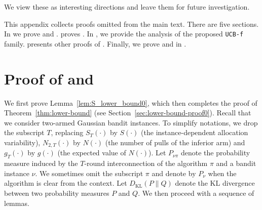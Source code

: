 \documentclass[nonblindrev]{informs3_noinforms}
\begin{document}
We view these as interesting directions and leave them for future investigation.



\newpage
\APPENDIX{}



This appendix collects proofs omitted from the main text. There are five sections. In  we prove  and .  proves . In , we provide the analysis of the proposed \texttt{UCB-f} family.  presents other proofs of . Finally, we prove  and  in .


\section{Proof of  and }\label{sec:lower-bound-proof}
{
We first prove Lemma~\ref{lem:S_lower_bound0}, which then completes the proof of Theorem~\ref{thm:lower-bound} (see Section~\ref{sec:lower-bound-proof0}). Recall that we consider two-armed Gaussian bandit instances. To simplify notations, we drop the subscript $T$, replacing $S_T(\cdot)$ by $S(\cdot)$ (the instance-dependent allocation variability), $N_{2, T}(\cdot)$ by $N(\cdot)$ (the number of pulls of the inferior arm) and $g_T(\cdot)$ by $g(\cdot)$ (the expected value of $N(\cdot)$). Let $P_{\nu\pi}$ denote the probability measure induced by the $T$-round interconnection of the algorithm $\pi$ and a bandit instance $\nu$. We sometimes omit the subscript $\pi$ and denote by $P_{\nu}$ when the algorithm is clear from the context. Let $D_{\text{KL}}(P\|Q)$ denote the KL divergence between two probability measures $P$ and $Q$. We then proceed with a sequence of lemmas.
}
\end{document}
